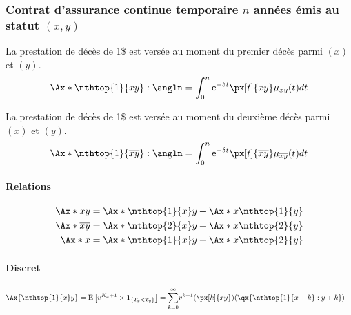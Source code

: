 \documentclass[10pt, french]{article}
\begin{document}
\begin{multicols*}{2}
\subsubsection*{Contrat d'assurance continue temporaire $n$ années émis au statut $(x, y)$}
La prestation de décès de 1\$ est versée au moment du premier décès parmi $(x)$ et $(y)$.
\begin{align*}
	\Ax*{\nthtop{1}{xy}:\angln}
	&=	\int_{0}^{n} \textrm{e}^{-\delta t} \px[t]{xy} \mu_{xy}(t) dt	\\
\end{align*}

La prestation de décès de 1\$ est versée au moment du deuxième décès parmi $(x)$ et $(y)$.
\begin{align*}
	\Ax*{\nthtop{1}{\overline{xy}}:\angln}
	&=	\int_{0}^{n} \textrm{e}^{-\delta t} \px[t]{\overline{xy}} \mu_{\overline{xy}}(t) dt	\\
\end{align*}

\paragraph*{Relations}
\begin{align*}
	\Ax*{xy}
	&=	\Ax*{\nthtop{1}{x}y} + \Ax*{x\nthtop{1}{y}}	\\
	\Ax*{\overline{xy}}
	&=	\Ax*{\nthtop{2}{x}y} + \Ax*{x\nthtop{2}{y}}	\\
	\Ax*{x}
	&=	\Ax*{\nthtop{1}{x}y} + \Ax*{x\nthtop{2}{y}}	\\
\end{align*}


\paragraph*{Discret}
	\begin{align*}
	\Ax{\nthtop{1}{x}y}
	&=	\esp{v^{K_{x} + 1} \times \bm{1}_{\{T_{x} < T_{y}\}}}
	=	\sumz{\infty}{k = 0} v^{k + 1} (\px[k]{xy})(\qx{\nthtop{1}{x + k} : y + k})
	\end{align*}



\end{multicols*}
\end{document}
